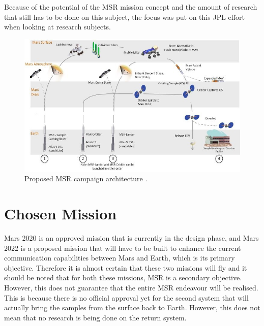 Because of the potential of the \ac{MSR} mission concept and the amount of research that still has to be done on this subject, the focus was put on this \ac{JPL} effort when looking at research subjects.


\begin{figure}[H]
\centering
\includegraphics[width=0.79 \textwidth]{figures/heritage/proposedMSRmissionArchitecture_vaughan2016technology.jpg}
\caption{Proposed \ac{MSR} campaign architecture \citep{vaughan2016technology}.}
\label{fig:proposedMSRmissionArchitecture_vaughan2016technology}
\end{figure}




\section{Chosen Mission}
\label{sec:chosenMission}
Mars 2020 is an approved mission that is currently in the design phase, and Mars 2022 is a proposed mission that will have to be built to enhance the current communication capabilities between Mars and Earth, which is its primary objective. Therefore it is almost certain that these two missions will fly and it should be noted that for both these missions, \ac{MSR} is a secondary objective. However, this does not guarantee that the entire \ac{MSR} endeavour will be realised. This is because there is no official approval yet for the second system that will actually bring the samples from the surface back to Earth. However, this does not mean that no research is being done on the return system. 

